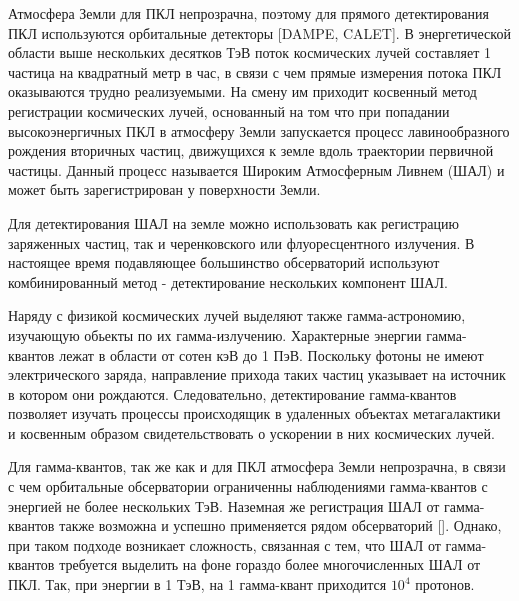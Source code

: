 
Атмосфера Земли для ПКЛ непрозрачна, поэтому для прямого детектирования ПКЛ используются орбитальные детекторы [DAMPE, CALET]. В энергетической области выше нескольких десятков ТэВ поток космических лучей составляет 1 частица на квадратный метр в час, в связи с чем прямые измерения потока ПКЛ оказываются трудно реализуемыми. На смену им приходит косвенный метод регистрации космических лучей, основанный на том что при попадании высокоэнергичных ПКЛ в атмосферу Земли запускается процесс лавинообразного рождения вторичных частиц, движущихся к земле вдоль траектории первичной частицы. Данный процесс называется Широким Атмосферным Ливнем (ШАЛ) и может быть зарегистрирован у поверхности Земли. 


Для детектирования ШАЛ на земле можно использовать как регистрацию заряженных частиц, так и черенковского или флуоресцентного излучения. В настоящее время подавляющее большинство обсерваторий используют комбинированный метод - детектирование нескольких компонент ШАЛ.

Наряду с физикой космических лучей выделяют также гамма-астрономию, изучающую обьекты по их гамма-излучению. Характерные энергии гамма-квантов лежат в области от сотен кэВ до 1 ПэВ. Поскольку фотоны не имеют электрического заряда, направление прихода таких частиц указывает на источник в котором они рождаются. Следовательно, детектирование гамма-квантов позволяет изучать процессы происходящик в удаленных объектах метагалактики и косвенным образом свидетельствовать о ускорении в них космических лучей.

Для гамма-квантов, так же как и для ПКЛ атмосфера Земли непрозрачна, в связи с чем орбитальные обсерватории ограниченны наблюдениями гамма-квантов с энергией не более нескольких ТэВ. Наземная же регистрация ШАЛ от гамма-квантов также возможна и успешно применяется рядом обсерваторий []. Однако, при таком подходе возникает сложность, связанная с тем, что ШАЛ от гамма-квантов требуется выделить на фоне гораздо более многочисленных ШАЛ от ПКЛ. Так, при энергии в 1 ТэВ, на 1 гамма-квант приходится $10^4$ протонов.

